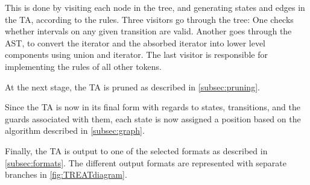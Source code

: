 This is done by visiting each node in the tree, and generating states and edges in the TA, according to the rules. Three visitors go through the tree: One checks whether intervals on any given transition are valid. Another goes through the AST, to convert the iterator and the absorbed iterator into lower level components using union and iterator. The last visitor is responsible for implementing the rules of all other tokens.

At the next stage, the TA is pruned as described in \cref{subsec:pruning}. 

Since the TA is now in its final form with regards to states, transitions, and the guards associated with them, each state is now assigned a position based on the algorithm described in \cref{subsec:graph}.

Finally, the TA is output to one of the selected formats as described in \cref{subsec:formats}. The different output formats are represented with separate branches in \cref*{fig:TREATdiagram}.
